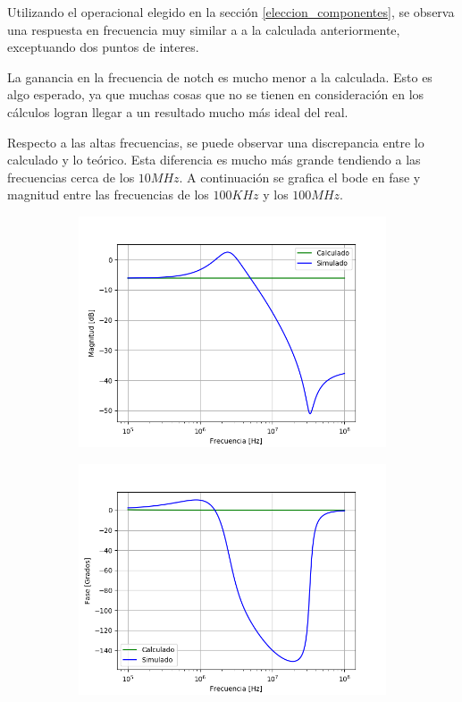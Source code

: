 \documentclass[a4paper]{article}
\begin{document}
Utilizando el operacional elegido en la sección \ref{eleccion_componentes}, se observa una respuesta en frecuencia muy similar a a la calculada anteriormente, exceptuando dos puntos de interes.

La ganancia en la frecuencia de notch es mucho menor a la calculada. Esto es algo esperado, ya que muchas cosas que no se tienen en consideración en los cálculos logran llegar a un resultado mucho más ideal del real.

Respecto a las altas frecuencias, se puede observar una discrepancia entre lo calculado y lo teórico. Esta diferencia es mucho más grande tendiendo a las frecuencias cerca de los $10MHz$. A continuación se grafica el bode en fase y magnitud entre las frecuencias de los $100KHz$ y los $100MHz$.

\begin{figure}[H]
	\centering
	\begin{subfigure}[t]{0.49\textwidth}
	\hspace*{-2cm}
	\centering
		\includegraphics[width=1.3\textwidth]{Imagenes/bodemag_calc_sim_highf.png}
	\end{subfigure}
	\begin{subfigure}[t]{0.49\textwidth}
	\centering
		\includegraphics[width=1.3\textwidth]{Imagenes/bodefase_calc_sim_highf.png}

\end{subfigure}
\end{figure}
\end{document}
